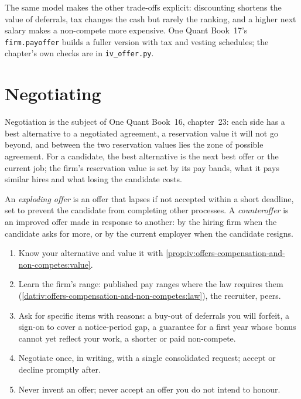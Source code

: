 The same model makes the other trade-offs explicit: discounting shortens the value of deferrals, tax changes
the cash but rarely the ranking, and a higher next salary makes a non-compete more expensive. One Quant
Book~17's \texttt{firm.payoffer} builds a fuller version with tax and vesting schedules; the chapter's own
checks are in \texttt{iv\_offer.py}.

\section{Negotiating}

Negotiation is the subject of One Quant Book~16, chapter~23: each side has a best alternative to a negotiated
agreement, a reservation value it will not go beyond, and between the two reservation values lies the zone of
possible agreement. For a candidate, the best alternative is the next best offer or the current job; the
firm's reservation value is set by its pay bands, what it pays similar hires and what losing the candidate
costs.

\begin{definition}\label{def:iv:offers-compensation-and-non-competes:exploding}
An \emph{exploding offer} is an offer that lapses if not accepted within a short
deadline, set to prevent the candidate from completing other processes. A \emph{counteroffer}
is an improved offer made in response to another: by the hiring firm when the candidate asks for more, or by
the current employer when the candidate resigns.
\end{definition}

\begin{method}\label{met:iv:offers-compensation-and-non-competes:negotiate}
\begin{enumerate}
\item Know your alternative and value it with \cref{prop:iv:offers-compensation-and-non-competes:value}.
\item Learn the firm's range: published pay ranges where the law requires them
(\cref{dat:iv:offers-compensation-and-non-competes:law}), the recruiter, peers.
\item Ask for specific items with reasons: a buy-out of deferrals you will forfeit, a sign-on to cover a
notice-period gap, a guarantee for a first year whose bonus cannot yet reflect your work, a shorter or paid
non-compete.
\item Negotiate once, in writing, with a single consolidated request; accept or decline promptly after.
\item Never invent an offer; never accept an offer you do not intend to honour.
\end{enumerate}
\end{method}

